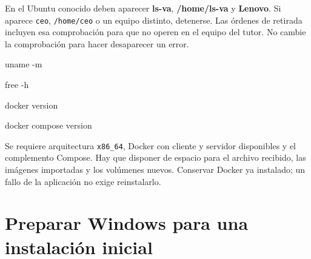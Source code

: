 \documentclass[
  spanish,
  10pt,
  a4paper,
]{article}
\newenvironment{Shaded}{}{}
\newcommand{\AttributeTok}[1]{#1}
\newcommand{\ExtensionTok}[1]{#1}
\newcommand{\FunctionTok}[1]{#1}
\newcommand{\NormalTok}[1]{#1}
\newcommand{\StringTok}[1]{#1}
\newcommand{\VariableTok}[1]{#1}
\renewenvironment{Shaded}{\begin{snugshade}}{\end{snugshade}}%
\begin{document}
En el Ubuntu conocido deben aparecer \textbf{ls-va},
\textbf{/home/ls-va} y \textbf{Lenovo}. Si aparece \texttt{ceo},
\texttt{/home/ceo} o un equipo distinto, detenerse. Las órdenes de
retirada incluyen esa comprobación para que no operen en el equipo del
tutor. No cambie la comprobación para hacer desaparecer un error.

\begin{Shaded}
\begin{Highlighting}[]
\FunctionTok{uname} \AttributeTok{{-}m}
\end{Highlighting}
\end{Shaded}

\begin{Shaded}
\begin{Highlighting}[]
\FunctionTok{free} \AttributeTok{{-}h}
\end{Highlighting}
\end{Shaded}

\begin{Shaded}
\end{Shaded}

\begin{Shaded}
\begin{Highlighting}[]
\ExtensionTok{docker}\NormalTok{ version}
\end{Highlighting}
\end{Shaded}

\begin{Shaded}
\begin{Highlighting}[]
\ExtensionTok{docker}\NormalTok{ compose version}
\end{Highlighting}
\end{Shaded}

Se requiere arquitectura \texttt{x86\_64}, Docker con cliente y servidor
disponibles y el complemento Compose. Hay que disponer de espacio para
el archivo recibido, las imágenes importadas y los volúmenes nuevos.
Conservar Docker ya instalado; un fallo de la aplicación no exige
reinstalarlo.

\clearpage

\section{Preparar Windows para una instalación
inicial}\label{preparar-windows-para-una-instalaciuxf3n-inicial}
\end{document}
